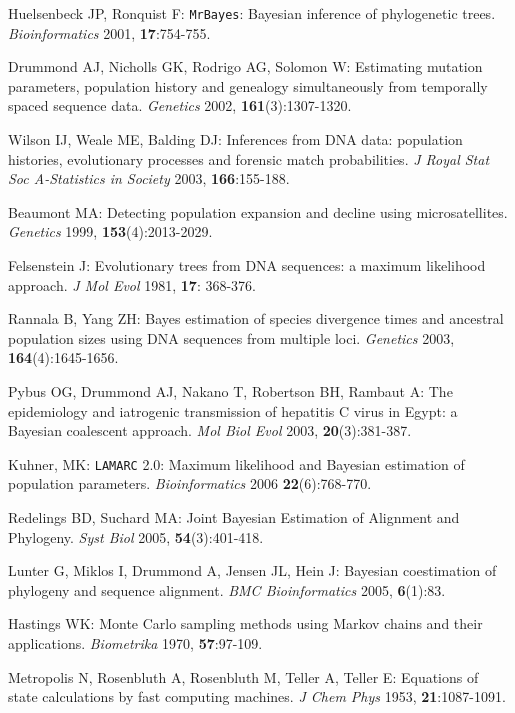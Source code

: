 \documentclass[cup7b, english]{cupbook}
\newcommand{\noun}[1]{\textsc{#1}}
\begin{document}
\begin{thebibliography}{77}
Huelsenbeck JP, Ronquist F: \texttt{MrBayes}: Bayesian inference
of phylogenetic trees. \emph{Bioinformatics} 2001, \textbf{17}:754-755.

Drummond AJ, Nicholls GK, Rodrigo AG, Solomon W:
Estimating mutation parameters, population history and genealogy simultaneously
from temporally spaced sequence data. \emph{Genetics} 2002, \textbf{\noun{161}}(3):1307-1320.

Wilson IJ, Weale ME, Balding DJ: Inferences from
DNA data: population histories, evolutionary processes and forensic
match probabilities. \emph{J Royal Stat Soc A-Statistics in Society}
2003, \textbf{166}:155-188.

Beaumont MA: Detecting population expansion
and decline using microsatellites. \emph{Genetics} 1999, \textbf{153}(4):2013-2029.

Felsenstein J: Evolutionary trees from DNA sequences: a maximum likelihood approach.
\emph{J Mol Evol} 1981, \textbf{17}: 368-376.

Rannala B, Yang ZH: Bayes estimation of species divergence
times and ancestral population sizes using DNA sequences from multiple
loci. \emph{Genetics} 2003, \textbf{164}(4):1645-1656.

Pybus OG, Drummond AJ, Nakano T, Robertson BH,
Rambaut A: The epidemiology and iatrogenic transmission of hepatitis
C virus in Egypt: a Bayesian coalescent approach. \emph{Mol Biol Evol}
2003, \textbf{20}(3):381-387.

Kuhner, MK: \texttt{LAMARC} 2.0: Maximum likelihood and
Bayesian estimation of population parameters. \emph{Bioinformatics}
2006 \textbf{22}(6):768-770.

Redelings BD, Suchard MA: Joint Bayesian Estimation
of Alignment and Phylogeny. \emph{Syst Biol} 2005, \textbf{54}(3):401-418.

Lunter G, Miklos I, Drummond A, Jensen JL, Hein
J: Bayesian coestimation of phylogeny and sequence alignment. \emph{BMC
Bioinformatics} 2005, \textbf{6}(1):83.

Hastings WK: Monte Carlo sampling methods using
Markov chains and their applications. \emph{Biometrika} 1970, \textbf{57}:97-109.

Metropolis N, Rosenbluth A, Rosenbluth M, Teller
A, Teller E: Equations of state calculations by fast computing machines.
\emph{J Chem Phys} 1953, \textbf{21}:1087-1091.


\end{thebibliography}
\end{document}
